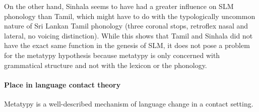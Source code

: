 On the other hand, Sinhala seems to have had a greater influence on SLM phonology than Tamil, which might have to do with the typologically uncommon nature of Sri Lankan Tamil phonology (three coronal stops, retroflex nasal and lateral, no voicing distinction).
While this shows that Tamil and Sinhala did not have the exact same function in the genesis of SLM, it does not pose a problem for the metatypy hypothesis because metatypy is only concerned with grammatical structure and not with the lexicon or the phonology.

\paragraph{Place in language contact theory}
Metatypy is a well-described mechanism of language change in a contact setting. 
% 
% 
% 
% 
% 
% 
% 
